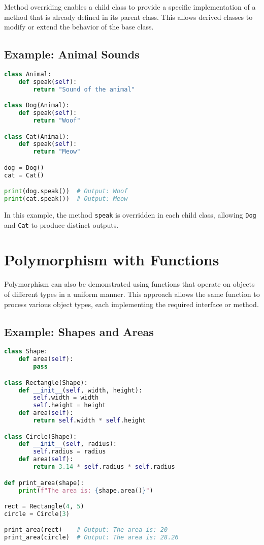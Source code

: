 Method overriding enables a child class to provide a specific implementation of a method that is already defined in its parent class. This allows derived classes to modify or extend the behavior of the base class.

\subsection{Example: Animal Sounds}

\begin{lstlisting}[language=Python, caption=Method Overriding with Animals]
class Animal:
    def speak(self):
        return "Sound of the animal"

class Dog(Animal):
    def speak(self):
        return "Woof"

class Cat(Animal):
    def speak(self):
        return "Meow"

dog = Dog()
cat = Cat()

print(dog.speak())  # Output: Woof
print(cat.speak())  # Output: Meow
\end{lstlisting}

In this example, the method \texttt{speak} is overridden in each child class, allowing \texttt{Dog} and \texttt{Cat} to produce distinct outputs.

\section{Polymorphism with Functions}

Polymorphism can also be demonstrated using functions that operate on objects of different types in a uniform manner. This approach allows the same function to process various object types, each implementing the required interface or method.

\subsection{Example: Shapes and Areas}

\begin{lstlisting}[language=Python, caption=Polymorphism with Shape Classes]
class Shape:
    def area(self):
        pass

class Rectangle(Shape):
    def __init__(self, width, height):
        self.width = width
        self.height = height
    def area(self):
        return self.width * self.height

class Circle(Shape):
    def __init__(self, radius):
        self.radius = radius
    def area(self):
        return 3.14 * self.radius * self.radius

def print_area(shape):
    print(f"The area is: {shape.area()}")

rect = Rectangle(4, 5)
circle = Circle(3)

print_area(rect)    # Output: The area is: 20
print_area(circle)  # Output: The area is: 28.26
\end{lstlisting}

